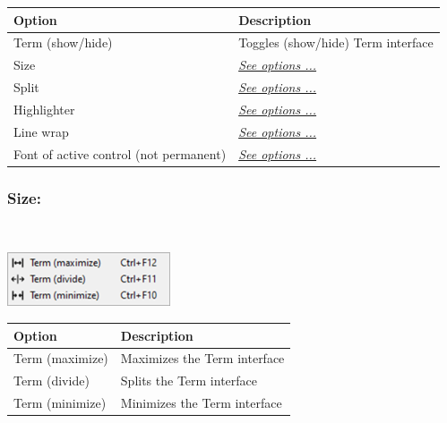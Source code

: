 \begin{scriptsize}
  \begin{tabularx}{\textwidth}{>{\hsize=0.7\hsize}X>{\hsize=0.7\hsize}X}\\
    \hline
    \textbf{Option} & \textbf{Description} \\
    \hline
    Term (show/hide) & Toggles (show/hide) Term interface \\
    \hdashline[1pt/1pt]
    Size & \textit{\href{\#menu\_view\_r\_term\_size}{See options ...}} \\
    Split & \textit{\href{\#menu\_view\_r\_term\_split}{See options ...}} \\
    Highlighter & \textit{\href{\#menu\_view\_r\_term\_highlighter}{See options ...}} \\
    Line wrap & \textit{\href{\#menu\_r\_term\_linewrap}{See options ...}} \\
    \hdashline[1pt/1pt]
    Font of active control (not permanent) & \textit{\href{\#menu\_r\_term\_fontsize}{See options ...}} \\
    \hline
  \end{tabularx}
\end{scriptsize}


\hypertarget{menu_view_r_term_size}{}
\subsubsection{Size:}\\

\includegraphics[scale=0.50]{./res/menu_r_term_size.png}\\

\begin{scriptsize}
  \begin{tabularx}{\textwidth}{>{\hsize=0.3\hsize}X>{\hsize=0.7\hsize}X}\\
    \hline
    \textbf{Option} & \textbf{Description} \\
    \hline
    Term (maximize) & Maximizes the Term interface \\
    Term (divide) & Splits the Term interface \\
    Term (minimize) & Minimizes the Term interface \\
    \hline
  \end{tabularx}
\end{scriptsize}


